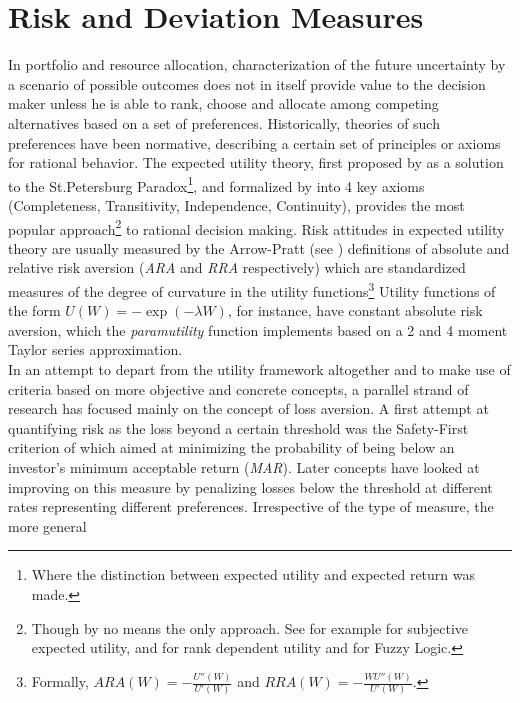 \section{Risk and Deviation Measures}\label{sec:2}
In portfolio and resource allocation, characterization of the future
uncertainty  by a scenario of possible outcomes does not in itself provide
value to the decision maker unless he is able to rank, choose and allocate
among competing alternatives based on a set of preferences. Historically,
theories of such preferences have been normative, describing a certain set of
principles or axioms for rational behavior. The expected utility theory,
first proposed by \citet{Bernoulli1954} as a solution to the
St.Petersburg Paradox\footnote{Where the distinction between expected utility
and expected return was made.}, and formalized by \citet{VonNeumann1944}
into 4 key axioms (Completeness, Transitivity, Independence, Continuity),
provides the most popular approach\footnote{Though by no means the only
approach. See for example \citet{Savage1962} for subjective expected
utility, \citet{Quiggin1982} and \citet{Schmeidler1989} for rank
dependent utility and \citet{Zadeh1965} for Fuzzy Logic.} to rational
decision making. Risk attitudes in expected utility theory are usually
measured by the Arrow-Pratt (see \citet{Arrow1963}) definitions of
absolute and relative risk aversion (\emph{ARA} and \emph{RRA} respectively)
which are standardized measures of the degree of curvature in the utility
functions\footnote{ Formally, $ARA\left( W \right)= - \frac{{U''\left( W
\right)}}{{U'\left( W \right)}}$ and $RRA\left( W \right)= -
\frac{{WU''\left( W \right)}}{{U'\left( W \right)}}$.} Utility functions of
the form $U\left( W \right)= - \exp \left( { - \lambda W} \right)$, for
instance, have constant absolute risk aversion, which the \emph{paramutility}
function implements based on a 2 and 4 moment Taylor series approximation.\\
In an attempt to depart from the utility framework altogether and to make
use of criteria based on more objective and concrete concepts, a parallel
strand of research has focused mainly on the concept of loss aversion. A
first attempt at quantifying risk as the loss beyond a certain threshold was
the Safety-First criterion of \citet{Roy1952} which aimed at minimizing
the probability of being below an investor's minimum acceptable return
(\emph{MAR}). Later concepts have looked at improving on this measure by
penalizing losses below the threshold at different rates representing
different preferences. Irrespective of the type of measure, the more general
